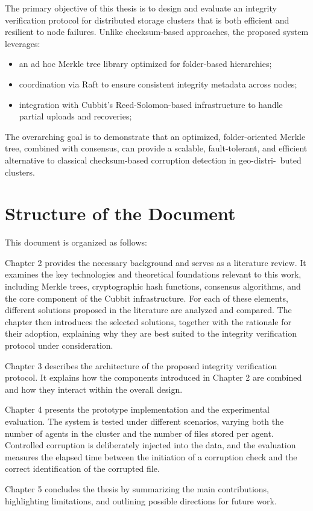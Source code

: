 The primary objective of this thesis is to design and evaluate an integrity verification protocol for distributed storage clusters that is both efficient and resilient to node failures. Unlike checksum-based approaches, the proposed system leverages:
\begin{itemize}
	\item an ad hoc Merkle tree library optimized for folder-based hierarchies;
	\item coordination via Raft to ensure consistent integrity
	      metadata across nodes;
	\item integration with Cubbit's Reed-Solomon-based infrastructure to handle partial uploads and recoveries;
\end{itemize}

The overarching goal is to demonstrate that an optimized, folder-oriented Merkle
tree, combined with consensus, can provide a scalable, fault-tolerant, and
efficient alternative to classical checksum-based corruption detection in
geo-distri-\ buted clusters.


\section{Structure of the Document}

This document is organized as follows:

Chapter 2 provides the necessary background and serves as a literature review. It examines the key technologies and theoretical foundations relevant to this work, including Merkle trees, cryptographic hash functions, consensus algorithms, and the core component of the Cubbit infrastructure. For each of these elements, different solutions proposed in the literature are analyzed and compared. The chapter then introduces the selected solutions, together with the rationale for their adoption, explaining why they are best suited to the integrity verification protocol under consideration.

Chapter 3 describes the architecture of the proposed integrity verification protocol. It explains how the components introduced in Chapter 2 are combined and how they interact within the overall design.

Chapter 4 presents the prototype implementation and the experimental evaluation. The system is tested under different scenarios, varying both the number of agents in the cluster and the number of files stored per agent. Controlled corruption is deliberately injected into the data, and the evaluation measures the elapsed time between the initiation of a corruption check and the correct identification of the corrupted file.

Chapter 5 concludes the thesis by summarizing the main contributions, highlighting limitations, and outlining possible directions for future work.
